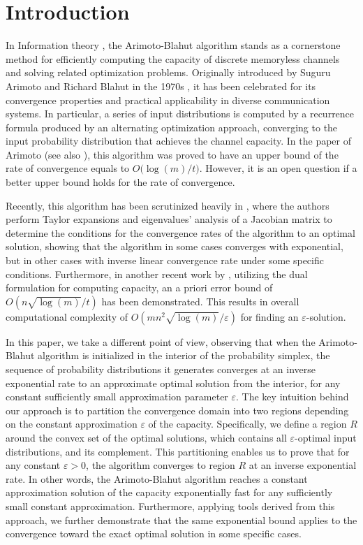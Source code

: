 \documentclass[11pt, letterpaper]{article}
\begin{document}
\section{Introduction}\label{sec:Introduction}

In Information theory \cite{Cover2006}, the Arimoto-Blahut algorithm stands as a cornerstone method for efficiently computing the capacity of discrete memoryless channels and solving related optimization problems. Originally introduced by Suguru Arimoto and Richard Blahut in the 1970s \cite{Arimoto1972AnAF,Blahut1972ComputationOC}, it has been celebrated for its convergence properties and practical applicability in diverse communication systems. In particular, a series of input distributions is computed by a recurrence formula produced by an alternating optimization approach, converging to the input probability distribution that achieves the channel capacity. In the paper of Arimoto (see also \cite{SutterSEL15,Jurgensen1984ANO}), this algorithm was proved to have an upper bound of the rate of convergence equals to $O\Big(\log(m)/{t}\Big)$. However, it is an open question if a better upper bound holds for the rate of convergence.  

Recently, this algorithm has been scrutinized heavily in \cite{Nakagawa2020AnalysisOT}, where the authors perform Taylor expansions and eigenvalues' analysis of a Jacobian matrix to determine the conditions for the convergence rates of the algorithm to an optimal solution, showing that the algorithm in some cases converges with exponential, but in other cases with inverse linear convergence rate under some specific conditions.  Furthermore, in another recent work by \cite{SutterSEL15}, utilizing the dual formulation for computing capacity, an a priori error bound of $O\left({n\sqrt{\log(m)}}/{t}\right)$ has been demonstrated. This results in overall computational complexity of $O\left({mn^2 \sqrt{\log(m)}}/{\varepsilon}\right)$ for finding an $\varepsilon$-solution. 

In this paper, we take a different point of view, observing that when the Arimoto-Blahut algorithm is initialized in the interior of the probability simplex, the sequence of probability distributions it generates converges at an inverse exponential rate to an approximate optimal solution from the interior, for any constant sufficiently small approximation parameter $\varepsilon$. The key intuition behind our approach is to partition the convergence domain into two regions depending on the constant approximation $\varepsilon$ of the capacity. Specifically, we define a region $R$ around the convex set of the optimal solutions, which contains all $\varepsilon$-optimal input distributions, and its complement. This partitioning enables us to prove that for any constant $\varepsilon > 0$, the algorithm converges to region $R$ at an inverse exponential rate. In other words, the Arimoto-Blahut algorithm reaches a constant approximation solution of the capacity exponentially fast for any sufficiently small constant approximation. Furthermore, applying tools derived from this approach, we further demonstrate that the same exponential bound applies to the convergence toward the exact optimal solution in some specific cases. 
 
\end{document}
